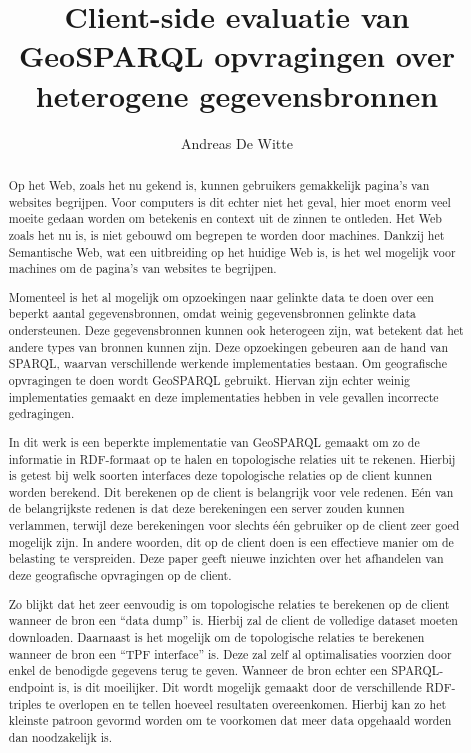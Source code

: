 \documentclass[twocolumn]{phdsymp} %
\begin{document}
\title{Client-side evaluatie van GeoSPARQL opvragingen over heterogene gegevensbronnen} %

\author{Andreas De Witte}


\maketitle

\begin{abstract}
    Op het Web, zoals het nu gekend is, kunnen gebruikers gemakkelijk pagina's van websites begrijpen. Voor computers is dit echter niet het geval, hier moet enorm veel moeite gedaan worden om betekenis en context uit de zinnen te ontleden. Het Web zoals het nu is, is niet gebouwd om begrepen te worden door machines. Dankzij het Semantische Web, wat een uitbreiding op het huidige Web is, is het wel mogelijk voor machines om de pagina's van websites te begrijpen.
    
    Momenteel is het al mogelijk om opzoekingen naar gelinkte data te doen over een beperkt aantal gegevensbronnen, omdat weinig gegevensbronnen gelinkte data ondersteunen. Deze gegevensbronnen kunnen ook heterogeen zijn, wat betekent dat het andere types van bronnen kunnen zijn. Deze opzoekingen gebeuren aan de hand van SPARQL, waarvan verschillende werkende implementaties bestaan. Om geografische opvragingen te doen wordt GeoSPARQL gebruikt. Hiervan zijn echter weinig implementaties gemaakt en deze implementaties hebben in vele gevallen incorrecte gedragingen.
    
    In dit werk is een beperkte implementatie van GeoSPARQL gemaakt om zo de informatie in RDF-formaat op te halen en topologische relaties uit te rekenen. Hierbij is getest bij welk soorten interfaces deze topologische relaties op de client kunnen worden berekend. Dit berekenen op de client is belangrijk voor vele redenen. Eén van de belangrijkste redenen is dat deze berekeningen een server zouden kunnen verlammen, terwijl deze berekeningen voor slechts één gebruiker op de client zeer goed mogelijk zijn. In andere woorden, dit op de client doen is een effectieve manier om de belasting te verspreiden. Deze paper geeft nieuwe inzichten over het afhandelen van deze geografische opvragingen op de client.

    Zo blijkt dat het zeer eenvoudig is om topologische relaties te berekenen op de client wanneer de bron een ``data dump'' is. Hierbij zal de client de volledige dataset moeten downloaden. Daarnaast is het mogelijk om de topologische relaties te berekenen wanneer de bron een ``TPF interface'' is. Deze zal zelf al optimalisaties voorzien door enkel de benodigde gegevens terug te geven. Wanneer de bron echter een SPARQL-endpoint is, is dit moeilijker. Dit wordt mogelijk gemaakt door de verschillende RDF-triples te overlopen en te tellen hoeveel resultaten overeenkomen. Hierbij kan zo het kleinste patroon gevormd worden om te voorkomen dat meer data opgehaald worden dan noodzakelijk is.
    

\end{abstract}
\end{document}
